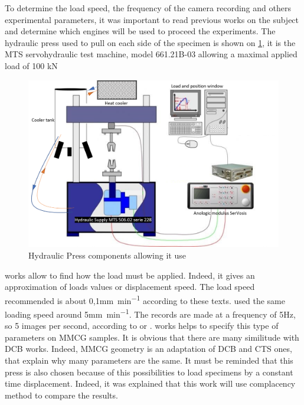 To determine the load speed, the frequency of the camera recording and others experimental parameters, it was important to read previous works on the subject and determine which engines will be used to proceed the experiments. The hydraulic press used to pull on each side of the specimen is shown on \ref{fig:HydrauPress}, it is the MTS servohydraulic test machine, model 661.21B-03 allowing a maximal applied load of 100 \si{\kilo\newton}

\begin{figure}[th]
	\centering
	\includegraphics[width=\textwidth]{Figures/Hydraulic_Press2}
	\decoRule
	\caption[Hydraulic Press fonctionnement]{Hydraulic Press components allowing it use}
	\label{fig:HydrauPress}
\end{figure}
	
\parencite{Reference17} works allow to find how the load must be applied. Indeed, it gives an approximation of loads values or displacement speed. The load speed recommended is about 0,1\si{\milli\meter\per\minute} according to these texts. \parencite{Reference7} used the same loading speed around 5\si{\milli\meter\per\minute}. The records are made at a frequency of 5Hz, so 5 images per second, according to \parencite{Reference17} or \parencite{Reference16}.
\parencite{Reference7} works helps to specify this type of parameters on MMCG samples. It is obvious that there are many similitude with DCB works. Indeed, MMCG geometry is an adaptation of DCB and CTS ones, that explain why many parameters are the same. It must be reminded that this press is also chosen because of this possibilities to load specimens by a constant time displacement. Indeed, it was explained that this work will use complacency method to compare the results.


